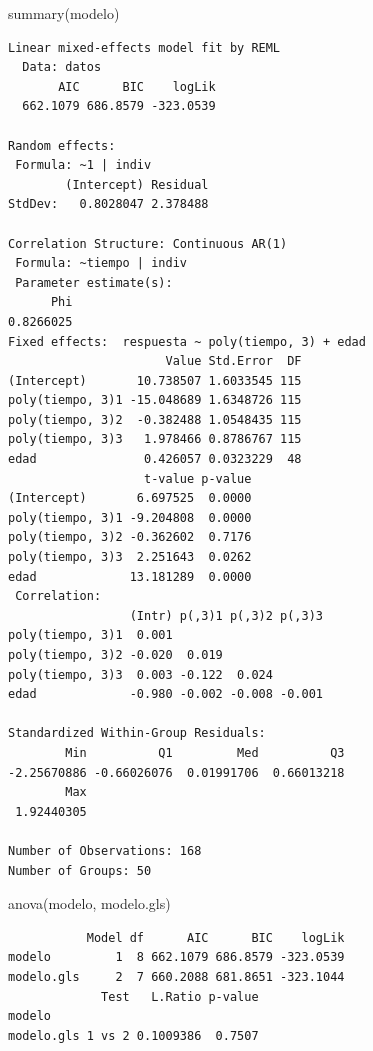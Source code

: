 \documentclass[
]{book}
\newenvironment{Shaded}{\begin{snugshade}}{\end{snugshade}}
\newcommand{\FunctionTok}[1]{\textcolor[rgb]{0.00,0.00,0.00}{#1}}
\newcommand{\NormalTok}[1]{#1}
\begin{document}
\begin{Shaded}
\begin{Highlighting}[]
\FunctionTok{summary}\NormalTok{(modelo)}
\end{Highlighting}
\end{Shaded}

\begin{verbatim}
Linear mixed-effects model fit by REML
  Data: datos 
       AIC      BIC    logLik
  662.1079 686.8579 -323.0539

Random effects:
 Formula: ~1 | indiv
        (Intercept) Residual
StdDev:   0.8028047 2.378488

Correlation Structure: Continuous AR(1)
 Formula: ~tiempo | indiv 
 Parameter estimate(s):
      Phi 
0.8266025 
Fixed effects:  respuesta ~ poly(tiempo, 3) + edad 
                      Value Std.Error  DF
(Intercept)       10.738507 1.6033545 115
poly(tiempo, 3)1 -15.048689 1.6348726 115
poly(tiempo, 3)2  -0.382488 1.0548435 115
poly(tiempo, 3)3   1.978466 0.8786767 115
edad               0.426057 0.0323229  48
                   t-value p-value
(Intercept)       6.697525  0.0000
poly(tiempo, 3)1 -9.204808  0.0000
poly(tiempo, 3)2 -0.362602  0.7176
poly(tiempo, 3)3  2.251643  0.0262
edad             13.181289  0.0000
 Correlation: 
                 (Intr) p(,3)1 p(,3)2 p(,3)3
poly(tiempo, 3)1  0.001                     
poly(tiempo, 3)2 -0.020  0.019              
poly(tiempo, 3)3  0.003 -0.122  0.024       
edad             -0.980 -0.002 -0.008 -0.001

Standardized Within-Group Residuals:
        Min          Q1         Med          Q3 
-2.25670886 -0.66026076  0.01991706  0.66013218 
        Max 
 1.92440305 

Number of Observations: 168
Number of Groups: 50 
\end{verbatim}

\begin{Shaded}
\begin{Highlighting}[]
\FunctionTok{anova}\NormalTok{(modelo, modelo.gls)}
\end{Highlighting}
\end{Shaded}

\begin{verbatim}
           Model df      AIC      BIC    logLik
modelo         1  8 662.1079 686.8579 -323.0539
modelo.gls     2  7 660.2088 681.8651 -323.1044
             Test   L.Ratio p-value
modelo                             
modelo.gls 1 vs 2 0.1009386  0.7507
\end{verbatim}
\end{document}
